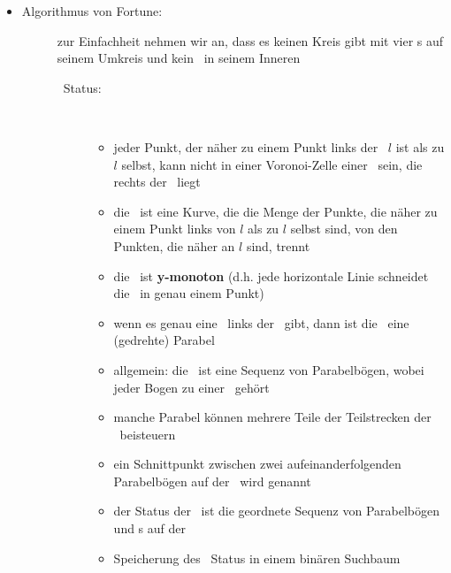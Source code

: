 \begin{itemize}
	\item \begin{description}
			\item[Algorithmus von Fortune:] zur Einfachheit nehmen wir an, dass es keinen Kreis gibt mit vier \site s auf seinem Umkreis und kein \site~in seinem Inneren \\\up
				\begin{description}
					\item[\sweep~Status:] \ \\\up
						\begin{itemize}
							\item jeder Punkt, der näher zu einem Punkt links der \sweep~$l$ ist als zu $l$ selbst, kann nicht in einer Voronoi-Zelle einer \site~sein, die rechts der \sweep~liegt
							\item die \textbf{\beach}~ist eine Kurve, die die Menge der Punkte, die näher zu einem Punkt links von $l$ als zu $l$ selbst sind, von den Punkten, die näher an $l$ sind, trennt
							\item die \beach~ist \textbf{y-monoton} (d.h. jede horizontale Linie schneidet die \beach~in genau einem Punkt)
							\item wenn es genau eine \site~links der \sweep~gibt, dann ist die \beach~eine (gedrehte) Parabel
							\item allgemein: die \beach~ist eine Sequenz von Parabelbögen, wobei jeder Bogen zu einer \site~gehört
							\item manche Parabel können mehrere Teile der Teilstrecken der \beach~beisteuern
							\item ein Schnittpunkt zwischen zwei aufeinanderfolgenden Parabelbögen auf der \beach~wird \textbf{\bpoint} genannt
							\item der Status der \sweep~ist die geordnete Sequenz von Parabelbögen und \bpoint s auf der \beach
							\item Speicherung des \sweep~Status in einem binären Suchbaum
						\end{itemize}
\end{description}
\end{description}
\end{itemize}
